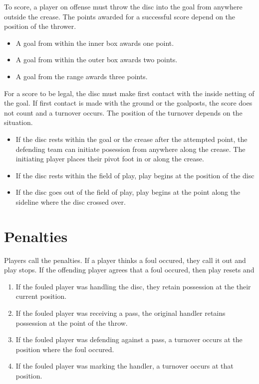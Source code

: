 \documentclass[10pt]{article}
\begin{document}
To score, a player on offense must throw the disc into the goal from anywhere outside the crease. The points awarded for a successful score depend on the position of the thrower. 

\begin{itemize}
    \item A goal from within the inner box awards one point.
    \item A goal from within the outer box awards two points.
    \item A goal from the range awards three points.
\end{itemize}

For a score to be legal, the disc must make first contact with the inside netting of the goal. If first contact is made with the ground or the goalposts, the score does not count and a turnover occurs. The position of the turnover depends on the situation.

\begin{itemize}
    \item If the disc rests within the goal or the crease after the attempted point, the defending team can initiate posession from anywhere along the crease. The initiating player places their pivot foot in or along the crease.
    \item If the disc rests within the field of play, play begins at the position of the disc
    \item If the disc goes out of the field of play, play begins at the point along the sideline where the disc crossed over.
\end{itemize}

\section{Penalties}

Players call the penalties. If a player thinks a foul occured, they call it out and play stops. If the offending player agrees that a foul occured, then play resets and
\begin{enumerate}
    \item If the fouled player was handling the disc, they retain possession at the their current position.
    \item If the fouled player was receiving a pass, the original handler retains possession at the point of the throw.
    \item If the fouled player was defending against a pass, a turnover occurs at the position where the foul occured.
    \item If the fouled player was marking the handler, a turnover occurs at that position.
\end{enumerate}
\end{document}
